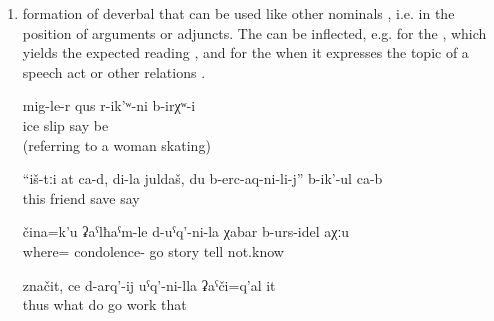\begin{enumerate}
	\item	formation of deverbal  that can be used like other nominals , i.e. in the position of arguments or adjuncts. The  can be inflected, e.g. for the , which yields the expected  reading , and for the  when it expresses the topic of a speech act  or other relations .
	\begin{exe}
		\ex	\label{ex:‎‎‎There was skating on the ice. (referring to a woman skating)}
		\gll	mig-le-r	qus	r-ik'ʷ-ni	b-irχʷ-i\\
			ice	slip	say	be\\
		\glt	{} (referring to a woman skating)

		\ex	\label{ex:‎‎‎These (gems) are for you, my friend, because you saved me, said the bear}
		\gll	``iš-tːi	at	ca-d,	di-la	juldaš,		du	b-erc-aq-ni-li-j''	b-ik'-ul	ca-b\\
			this				friend			\tsc{n-}save		say	\\
		\glt	{}

		\ex	\label{ex:‎‎‎I don't know if I should tell you the story about how we went somewhere}
		\gll	čina=k'u	ʡaˁlħaˁm-le	d-uˁq'-ni-la		χabar	b-urs-idel	aχːu\\
			where=	condolence-	go	story	tell	not.know\\
		\glt	{}

		\ex	\label{ex:What to do, this pasturing (lit. the work of going after the animals) is work}
		\gll	značit,	ce	d-arq'-ij	uˁq'-ni-lla	ʡaˁči=q'al	it\\
			thus	what	do	go	work	that\\
		\glt	{}
	\end{exe}	
\end{enumerate}



